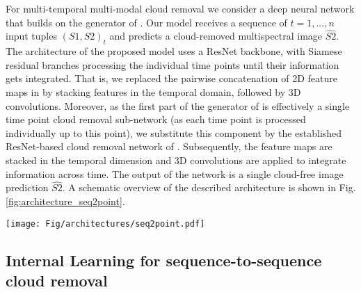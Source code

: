 \documentclass[journal]{IEEEtran}
\begin{document}
For multi-temporal multi-modal cloud removal we consider a deep neural network that builds on the generator of \cite{Sarukkai_Jain_Uzkent_Ermon_2019}. Our model receives a sequence of $t=1, ..., n$ input tuples $\left (S1, S2 \right )_t$ and predicts a cloud-removed multispectral image $\hat{S2}$. The architecture of the proposed model uses a ResNet \cite{he2016deep} backbone, with Siamese residual branches processing the individual time points until their information gets integrated. That is, we replaced the pairwise concatenation of 2D feature maps in \cite{Sarukkai_Jain_Uzkent_Ermon_2019} by stacking features in the temporal domain, followed by 3D convolutions. Moreover, as the first part of the generator of \cite{Sarukkai_Jain_Uzkent_Ermon_2019} is effectively a single time point cloud removal sub-network (as each time point is processed individually up to this point), we substitute this component by the established ResNet-based \cite{he2016deep} cloud removal network of \cite{meraner2020cloud}. Subsequently, the feature maps are stacked in the temporal dimension and 3D convolutions are applied to integrate information across time. The output of the network is a single cloud-free image prediction $\hat{S2}$. A schematic overview of the described architecture is shown in Fig. \ref{fig:architecture_seq2point}.


\begin{figure*}[h!tb] \texttt{[image: Fig/architectures/seq2point.pdf]}
    \caption{A conceptual illustration of the sequence-to-point cloud removal architecture $G_{seq2point}$. The network is based on the architecture of \cite{Sarukkai_Jain_Uzkent_Ermon_2019} and consists of $n$ siamese ResNet branches \cite{meraner2020cloud} doing single time point cloud removal on $n$ individual time points. Subsequently, the feature maps are stacked in the temporal dimension and 3D convolutions are applied to integrate information across time. The output of the network is a single cloud-free image prediction.}
    \label{fig:architecture_seq2point}
\end{figure*}

\subsection{Internal Learning for sequence-to-sequence cloud removal} \label{subsec:seq2se2method}
\end{document}

